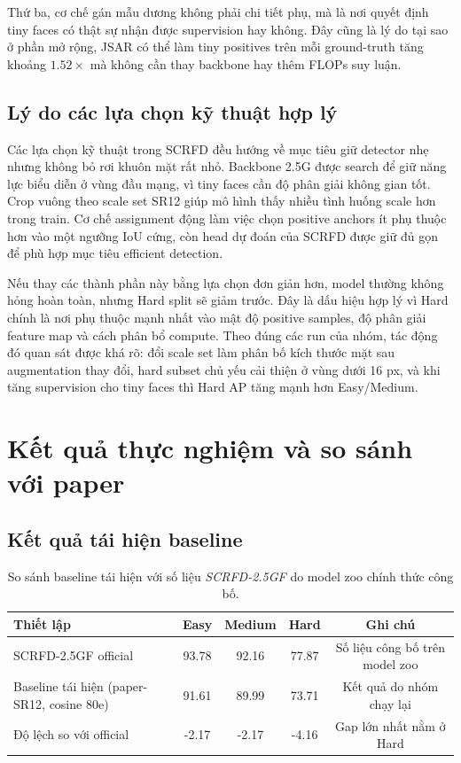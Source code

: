 Thứ ba, cơ chế gán mẫu dương không phải chi tiết phụ, mà là nơi quyết định tiny faces có thật sự nhận được supervision hay không. Đây cũng là lý do tại sao ở phần mở rộng, JSAR có thể làm tiny positives trên mỗi ground-truth tăng khoảng \(1.52\times\) mà không cần thay backbone hay thêm FLOPs suy luận.

\section{Lý do các lựa chọn kỹ thuật hợp lý}

Các lựa chọn kỹ thuật trong SCRFD đều hướng về mục tiêu giữ detector nhẹ nhưng không bỏ rơi khuôn mặt rất nhỏ. Backbone 2.5G được search để giữ năng lực biểu diễn ở vùng đầu mạng, vì tiny faces cần độ phân giải không gian tốt. Crop vuông theo scale set SR12 giúp mô hình thấy nhiều tình huống scale hơn trong train. Cơ chế assignment động làm việc chọn positive anchors ít phụ thuộc hơn vào một ngưỡng IoU cứng, còn head dự đoán của SCRFD được giữ đủ gọn để phù hợp mục tiêu efficient detection.

Nếu thay các thành phần này bằng lựa chọn đơn giản hơn, model thường không hỏng hoàn toàn, nhưng Hard split sẽ giảm trước. Đây là dấu hiệu hợp lý vì Hard chính là nơi phụ thuộc mạnh nhất vào mật độ positive samples, độ phân giải feature map và cách phân bổ compute. Theo đúng các run của nhóm, tác động đó quan sát được khá rõ: đổi scale set làm phân bố kích thước mặt sau augmentation thay đổi, hard subset chủ yếu cải thiện ở vùng dưới 16 px, và khi tăng supervision cho tiny faces thì Hard AP tăng mạnh hơn Easy/Medium.

\chapter{Kết quả thực nghiệm và so sánh với paper}

\section{Kết quả tái hiện baseline}

\begin{table}[H]
\centering
\caption{So sánh baseline tái hiện với số liệu \textit{SCRFD-2.5GF} do model zoo chính thức công bố.}
\small
\begin{tabular}{@{}lcccc@{}}
\toprule
\textbf{Thiết lập} & \textbf{Easy} & \textbf{Medium} & \textbf{Hard} & \textbf{Ghi chú} \\
\midrule
SCRFD-2.5GF official & 93.78 & 92.16 & 77.87 & Số liệu công bố trên model zoo \\
Baseline tái hiện (paper-SR12, cosine 80e) & 91.61 & 89.99 & 73.71 & Kết quả do nhóm chạy lại \\
\midrule
Độ lệch so với official & -2.17 & -2.17 & -4.16 & Gap lớn nhất nằm ở Hard \\
\bottomrule
\end{tabular}
\end{table}

